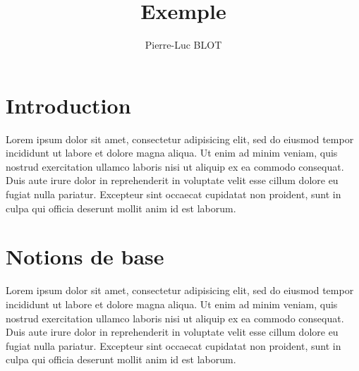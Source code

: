 \documentclass{article}
\title{Exemple}
\author{Pierre-Luc BLOT}
\begin{document}
	\maketitle
	\newpage
	\tableofcontents
	\newpage

	\section{Introduction}
		Lorem ipsum dolor sit amet, consectetur adipisicing elit, sed do eiusmod
		tempor incididunt ut labore et dolore magna aliqua. Ut enim ad minim veniam,
		quis nostrud exercitation ullamco laboris nisi ut aliquip ex ea commodo
		consequat. Duis aute irure dolor in reprehenderit in voluptate velit esse
		cillum dolore eu fugiat nulla pariatur. Excepteur sint occaecat cupidatat non
		proident, sunt in culpa qui officia deserunt mollit anim id est laborum.
	\section{Notions de base}
		Lorem ipsum dolor sit amet, consectetur adipisicing elit, sed do eiusmod
		tempor incididunt ut labore et dolore magna aliqua. Ut enim ad minim veniam,
		quis nostrud exercitation ullamco laboris nisi ut aliquip ex ea commodo
		consequat. Duis aute irure dolor in reprehenderit in voluptate velit esse
		cillum dolore eu fugiat nulla pariatur. Excepteur sint occaecat cupidatat non
		proident, sunt in culpa qui officia deserunt mollit anim id est laborum.
\end{document}
